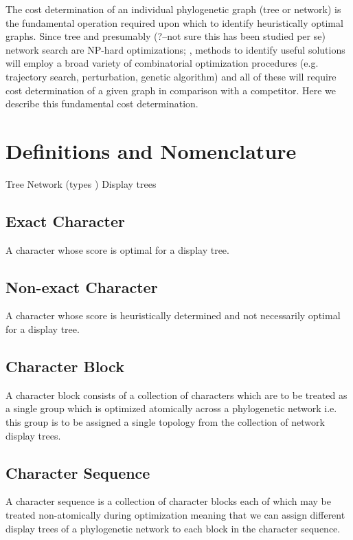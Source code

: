 \documentclass[12pt]{article}
\begin{document}
The cost determination of an individual phylogenetic graph (tree or network) is the fundamental operation required upon which to
identify heuristically optimal graphs.  Since tree and presumably (?--not sure this has been studied per se) network search are NP-hard optimizations;
\citep{foulds1982, Day1987, Roch2006}, methods to identify useful solutions will employ a broad variety of combinatorial
optimization procedures  (e.g. trajectory search, perturbation, genetic algorithm) and all of these will require cost determination
of a given graph in comparison with a competitor.  Here we describe this fundamental cost determination.

\section{Definitions and Nomenclature}
Tree
Network (types )
Display trees

\subsection{Exact Character}

A character whose score is optimal for a display tree.

\subsection{Non-exact Character}

A character whose score is heuristically determined and not necessarily optimal for a display tree.

\subsection{Character Block}

A character block consists of a collection of characters which are to be treated as a single group which is optimized atomically across a phylogenetic network i.e. this group is to be assigned a single topology from the collection of network display trees.

\subsection{Character Sequence}

A character sequence is a collection of character blocks each of which may be treated non-atomically during optimization meaning that we can assign different display trees of a phylogenetic network to each block in the character sequence.
\end{document}
